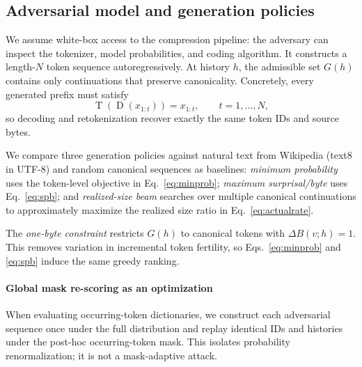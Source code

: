 \documentclass{article}
\newcommand{\Dec}{\operatorname{D}}
\newcommand{\Tok}{\operatorname{T}}
\begin{document}
\subsection{Adversarial model and generation policies}

We assume white-box access to the compression pipeline: the adversary can inspect the tokenizer, model probabilities, and coding algorithm. It constructs a length-$N$ token sequence autoregressively. At history $h$, the admissible set $G(h)$ contains only continuations that preserve canonicality. Concretely, every generated prefix must satisfy
\begin{equation}
  \Tok\!\left(\Dec(x_{1:t})\right)=x_{1:t},
  \qquad t=1,\ldots,N,
  \label{eq:canonicality}
\end{equation}
so decoding and retokenization recover exactly the same token IDs and source bytes.

We compare three generation policies against natural text from Wikipedia (text8 in UTF-8) and random canonical sequences as baselines:
\emph{minimum probability} uses the token-level objective in Eq.~\ref{eq:minprob};
\emph{maximum surprisal/byte} uses Eq.~\ref{eq:spb}; and
\emph{realized-size beam} searches over multiple canonical continuations to approximately maximize the realized size ratio in Eq.~\ref{eq:actualrate}.





The \emph{one-byte constraint} restricts $G(h)$ to canonical tokens with $\Delta B(v;h)=1$. This removes variation in incremental token fertility, so Eqs.~\ref{eq:minprob} and \ref{eq:spb} induce the same greedy ranking.

\paragraph{Global mask re-scoring as an optimization} 
When evaluating occurring-token dictionaries, we construct each adversarial sequence once under the full distribution and replay identical IDs and histories under the post-hoc occurring-token mask. This isolates probability renormalization; it is not a mask-adaptive attack.
\end{document}
